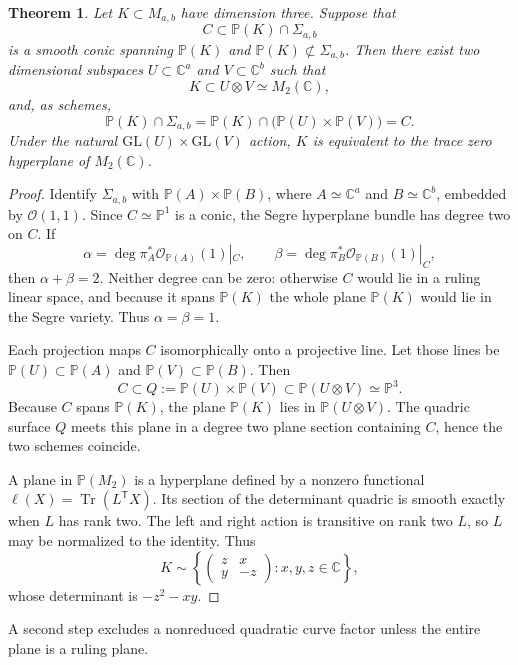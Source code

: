 \documentclass[11pt]{amsart}
\newcommand{\chg}[1]{#1}
\newcommand{\Tr}{\operatorname{Tr}}
\theoremstyle{plain}
\newtheorem{theorem}{Theorem}[section]
\theoremstyle{definition}
\theoremstyle{remark}
\begin{document}
\begin{theorem}\label{thm:smooth-conic}
Let $K\subset M_{a,b}$ have dimension three. Suppose that
\[
C\subset\mathbb P(K)\cap\Sigma_{a,b}
\]
is a smooth conic spanning $\mathbb P(K)$ and $\mathbb P(K)\not\subset\Sigma_{a,b}$. Then there exist \chg{two dimensional} subspaces $U\subset\mathbb C^a$ and $V\subset\mathbb C^b$ such that
\[
K\subset U\otimes V\simeq M_2(\mathbb C),
\]
and, \chg{as schemes},
\[
\mathbb P(K)\cap\Sigma_{a,b}
=\mathbb P(K)\cap\bigl(\mathbb P(U)\times\mathbb P(V)\bigr)=C.
\]
Under the natural $\mathrm{GL}(U)\times\mathrm{GL}(V)$ action, $K$ is equivalent to the trace zero hyperplane of $M_2(\mathbb C)$.
\end{theorem}

\begin{proof}
Identify $\Sigma_{a,b}$ with $\mathbb P(A)\times\mathbb P(B)$, where $A\simeq\mathbb C^a$ and $B\simeq\mathbb C^b$, embedded by $\mathcal O(1,1)$. Since $C\simeq\mathbb P^1$ is a conic, the Segre hyperplane bundle has degree two on $C$. If
\[
\alpha=\deg\pi_A^*\mathcal O_{\mathbb P(A)}(1)|_C,
\qquad
\beta=\deg\pi_B^*\mathcal O_{\mathbb P(B)}(1)|_C,
\]
then $\alpha+\beta=2$. Neither degree can be zero: otherwise $C$ would lie in a ruling linear space, and because it spans $\mathbb P(K)$ the whole plane $\mathbb P(K)$ would lie in the Segre variety. Thus $\alpha=\beta=1$.

Each projection maps $C$ isomorphically onto a projective line. Let those lines be $\mathbb P(U)\subset\mathbb P(A)$ and $\mathbb P(V)\subset\mathbb P(B)$. Then
\[
C\subset Q:=\mathbb P(U)\times\mathbb P(V)\subset\mathbb P(U\otimes V)\simeq\mathbb P^3.
\]
Because $C$ spans $\mathbb P(K)$, the plane $\mathbb P(K)$ lies in $\mathbb P(U\otimes V)$. The quadric surface $Q$ meets this plane in a degree two plane section containing $C$, hence the two schemes coincide.

A plane in $\mathbb P(M_2)$ is a hyperplane defined by a nonzero functional $\ell(X)=\Tr(L^{\mathsf T}X)$. Its section of the determinant quadric is smooth exactly when $L$ has rank two. The \chg{left and right action} is transitive on rank two $L$, so $L$ may be normalized to the identity. Thus
\[
K\sim\left\{
\begin{pmatrix}z&x\\y&-z\end{pmatrix}:x,y,z\in\mathbb C
\right\},
\]
whose determinant is $-z^2-xy$.
\end{proof}

\chg{A second step excludes a nonreduced quadratic curve factor unless the entire plane is a ruling plane.}
\end{document}
